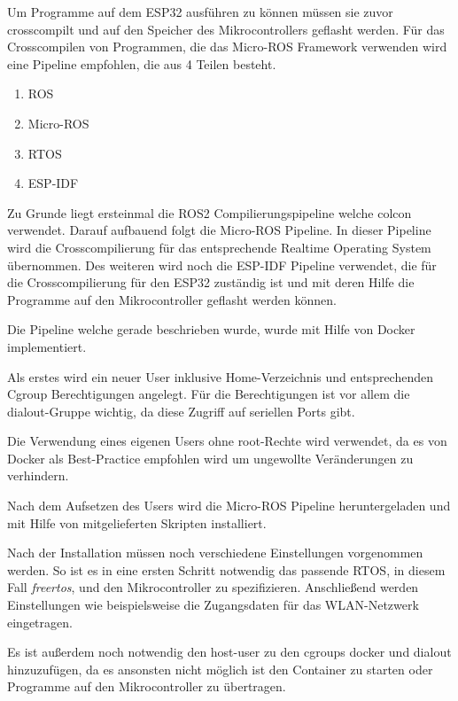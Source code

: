 \begin{flushleft}


    Um Programme auf dem ESP32 ausführen zu können müssen sie zuvor crosscompilt und auf den Speicher des Mikrocontrollers geflasht werden.
    Für das Crosscompilen von Programmen, die das Micro-ROS Framework verwenden wird eine Pipeline empfohlen, die aus 4 Teilen besteht.
    \begin{enumerate}
        \item ROS
        \item Micro-ROS
        \item RTOS
        \item ESP-IDF
    \end{enumerate}

    Zu Grunde liegt ersteinmal die ROS2 Compilierungspipeline welche colcon verwendet.
    Darauf aufbauend folgt die Micro-ROS Pipeline. In dieser Pipeline wird die Crosscompilierung für das entsprechende Realtime Operating System übernommen.
    Des weiteren wird noch die ESP-IDF Pipeline verwendet, die für die Crosscompilierung für den ESP32 zuständig ist und mit deren Hilfe die Programme auf den Mikrocontroller geflasht werden können.

    Die Pipeline welche gerade beschrieben wurde, wurde mit Hilfe von Docker implementiert.

    Als erstes wird ein neuer User inklusive Home-Verzeichnis und entsprechenden Cgroup Berechtigungen angelegt.
    Für die Berechtigungen ist vor allem die dialout-Gruppe wichtig, da diese Zugriff auf seriellen Ports gibt.

    Die Verwendung eines eigenen Users ohne root-Rechte wird verwendet, 
    da es von Docker als Best-Practice empfohlen wird um ungewollte Veränderungen zu verhindern.


    Nach dem Aufsetzen des Users wird die Micro-ROS Pipeline heruntergeladen und mit Hilfe von mitgelieferten Skripten installiert.

    Nach der Installation müssen noch verschiedene Einstellungen vorgenommen werden. So ist es in eine ersten Schritt notwendig das passende RTOS, in diesem Fall \textit{freertos},
    und den Mikrocontroller zu spezifizieren. Anschließend werden Einstellungen wie beispielsweise die Zugangsdaten für das WLAN-Netzwerk eingetragen.

    Es ist außerdem noch notwendig den host-user zu den cgroups docker und dialout hinzuzufügen, 
    da es ansonsten nicht möglich ist den Container zu starten oder Programme auf den Mikrocontroller zu übertragen.



\end{flushleft}
